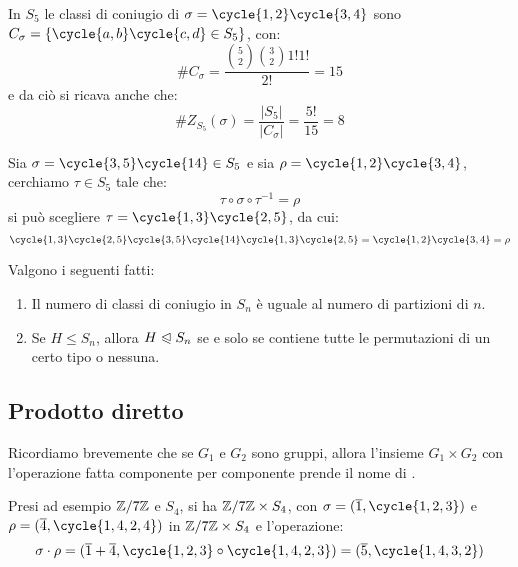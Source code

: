 \documentclass[11pt]{scrartcl}
\begin{document}
\begin{example}
    In $S_5$ le classi di coniugio di $\sigma = \cycle{1,2}\cycle{3,4}$ sono $C_\sigma = \{\cycle{a,b}\cycle{c,d} \in S_5\}$, con:
        \[ \#C_\sigma = \frac{\binom{5}{2}\binom{3}{2}1!1!}{2!} = 15
            \]
    e da ciò si ricava anche che:
        \[ \#Z_{S_5}(\sigma) = \frac{|S_5|}{|C_\sigma|} = \frac{5!}{15} = 8
            \]
\end{example}

\begin{example}
    Sia $\sigma = \cycle{3,5}\cycle{14} \in S_5$ e sia $\rho = \cycle{1,2}\cycle{3,4}$, cerchiamo $\tau \in S_5$ tale che:
        \[ \tau\circ\sigma\circ\tau^{-1} = \rho
            \]
    si può scegliere $\tau = \cycle{1,3}\cycle{2,5}$, da cui:
        \[ \cycle{1,3}\cycle{2,5}\cycle{3,5}\cycle{14}\cycle{1,3}\cycle{2,5} = \cycle{1,2}\cycle{3,4} = \rho
            \]
\end{example}

\begin{corollary}
    \label{c:1.68}
    Valgono i seguenti fatti:
        \begin{enumerate}[(1)]
            \item Il numero di classi di coniugio in $S_n$ è uguale al numero di partizioni di $n$.
            \item Se $H \leqslant S_n$, allora $H \trianglelefteqslant S_n$ se e solo se contiene tutte le permutazioni di un certo tipo o nessuna.
        \end{enumerate}
\end{corollary}

\pagebreak

\subsection{Prodotto diretto}
Ricordiamo brevemente che se $G_1$ e $G_2$ sono gruppi, allora l'insieme $G_1 \times G_2$ con l'operazione fatta componente per componente prende il nome di .

\begin{example}
    Presi ad esempio $\mathbb{Z}/{7}\mathbb{Z}$ e $S_4$, si ha $\mathbb{Z}/{7}\mathbb{Z} \times S_4$, con $\sigma = (\overline 1, \cycle{1,2,3})$ e $\rho = (\overline 4, \cycle{1,4,2,4})$ in $\mathbb{Z}/{7}\mathbb{Z} \times S_4$ e l'operazione:
        \[ \sigma \cdot \rho = (\overline 1 + \overline 4, \cycle{1,2,3} \circ \cycle{1,4,2,3}) = (\overline 5, \cycle{1,4,3,2})
            \]
\end{example}
\end{document}
